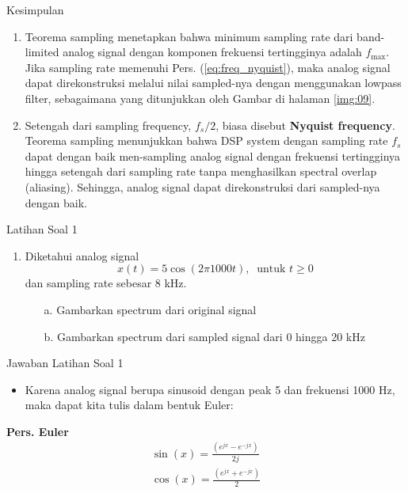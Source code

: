 \documentclass[pdflatex,compress,mathserif]{beamer}
\begin{document}
\begin{frame}{Kesimpulan}
    \begin{enumerate}
        \item Teorema sampling menetapkan bahwa minimum sampling rate dari band-limited analog signal dengan komponen frekuensi tertingginya adalah $f_{\text{max}}$. Jika sampling rate memenuhi Pers. (\ref{eq:freq_nyquist}), maka analog signal dapat direkonstruksi melalui nilai sampled-nya dengan menggunakan lowpass filter, sebagaimana yang ditunjukkan oleh Gambar di halaman \ref{img:09}.
        \item Setengah dari sampling frequency, $f_s / 2$, biasa disebut \textbf{Nyquist frequency}. Teorema sampling menunjukkan bahwa DSP system dengan sampling rate $f_s$ dapat dengan baik men-sampling analog signal dengan frekuensi tertingginya hingga setengah dari sampling rate tanpa menghasilkan spectral overlap (aliasing). Sehingga, analog signal dapat direkonstruksi dari sampled-nya dengan baik.
    \end{enumerate}
\end{frame}

\begin{frame}{Latihan Soal 1}
    \begin{enumerate}
        \item Diketahui analog signal
        \begin{equation*}
            x(t) = 5 \cos (2 \pi 1000 t),~\text{ untuk } t \geq 0
        \end{equation*}
        dan sampling rate sebesar 8 kHz.
        \begin{enumerate}
            \item[a.] Gambarkan spectrum dari original signal
            \item[b.] Gambarkan spectrum dari sampled signal dari 0 hingga 20 kHz
        \end{enumerate}
    \end{enumerate}
\end{frame}

\begin{frame}{Jawaban Latihan Soal 1}
    \begin{itemize}
        \item Karena analog signal berupa sinusoid dengan peak 5 dan frekuensi 1000 Hz, maka dapat kita tulis dalam bentuk Euler:
    \end{itemize}
    \begin{framed}
    \textbf{Pers. Euler}
        \begin{align}
            \sin(x) = \frac{(e^{jx} - e^{-jx})}{2j} \\
            \cos(x) = \frac{(e^{jx} + e^{-jx})}{2}
        \end{align}
    \end{framed}
\end{frame}
\end{document}
